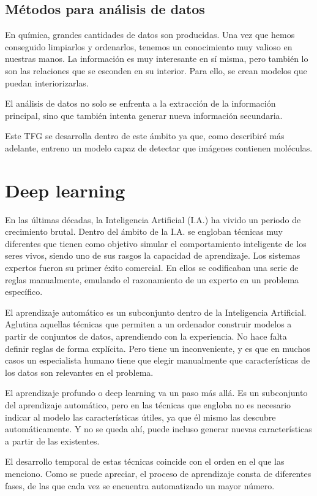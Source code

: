 \subsection{Métodos para análisis de datos}
En química, grandes cantidades de datos son producidas. Una vez que hemos conseguido limpiarlos y ordenarlos, tenemos un conocimiento muy valioso en nuestras manos. La información es muy interesante en sí misma, pero también lo son las relaciones que se esconden en su interior. Para ello, se crean modelos que puedan interiorizarlas.

El análisis de datos no solo se enfrenta a la extracción de la información principal, sino que también intenta generar nueva información secundaria. \cite{doi:10.1021/ci600234z}

Este TFG se desarrolla dentro de este ámbito ya que, como describiré más adelante, entreno un modelo capaz de detectar que imágenes contienen moléculas.

\newpage
\section{Deep learning}
En las últimas décadas, la Inteligencia Artificial (I.A.) ha vivido un periodo de crecimiento brutal. Dentro del ámbito de la I.A. se engloban técnicas muy diferentes que tienen como objetivo simular el comportamiento inteligente de los seres vivos, siendo uno de sus rasgos la capacidad de aprendizaje. Los sistemas expertos fueron su primer éxito comercial. En ellos se codificaban una serie de reglas manualmente, emulando el razonamiento de un experto en un problema específico.

El aprendizaje automático es un subconjunto dentro de la Inteligencia Artificial. Aglutina aquellas técnicas que permiten a un ordenador construir modelos a partir de conjuntos de datos, aprendiendo con la experiencia. No hace falta definir reglas de forma explícita. Pero tiene un inconveniente, y es que en muchos casos un especialista humano tiene que elegir manualmente que características de los datos son relevantes en el problema.

El aprendizaje profundo o deep learning va un paso más allá. Es un subconjunto del aprendizaje automático, pero en las técnicas que engloba no es necesario indicar al modelo las características útiles, ya que él mismo las descubre automáticamente. Y no se queda ahí, puede incluso generar nuevas características a partir de las existentes.

El desarrollo temporal de estas técnicas coincide con el orden en el que las menciono. Como se puede apreciar, el proceso de aprendizaje consta de diferentes fases, de las que cada vez se encuentra automatizado un mayor número. \cite{berzal2018redes}

